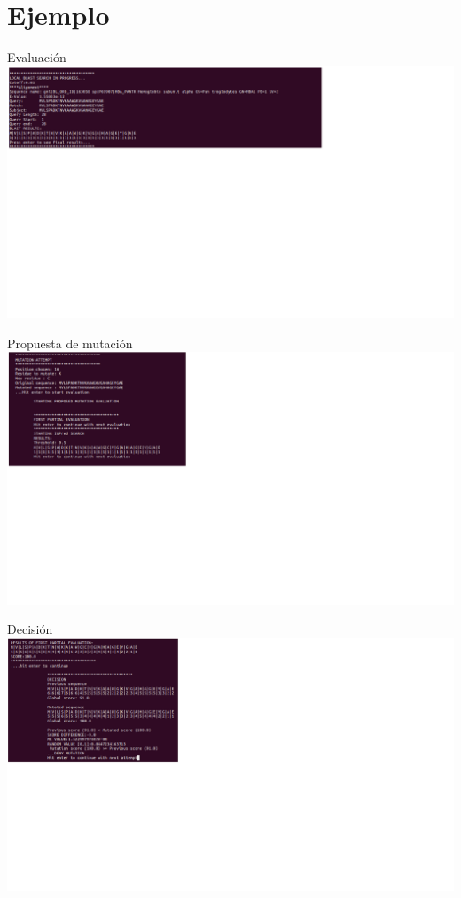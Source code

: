 \documentclass{beamer}
\begin{document}
\section{Ejemplo}
\begin{frame}{Evaluación}
 \includegraphics[width=1.7\textwidth,height=2.2\textheight]{blastExample.png}
\end{frame}

\begin{frame}{Propuesta de mutación}
 \includegraphics[width=2.4\textwidth,height=1.9\textheight]{mutAttempt.png}
\end{frame}

\begin{frame}{Decisión}
 \includegraphics[width=2.4\textwidth,height=1.9\textheight]{decision.png}
\end{frame}
\end{document}
